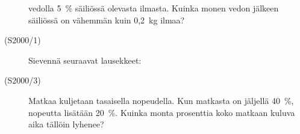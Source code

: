 \begin{description}
                        vedolla 5~\% säiliössä olevasta ilmasta. Kuinka monen vedon
                        jälkeen säiliössä on vähemmän kuin 0,2~kg ilmaa?
    \item[(S2000/1)]   Sievennä seuraavat lausekkeet:
                        \begin{alakohdat}
                        \end{alakohdat}
    \item[(S2000/3)]   Matkaa kuljetaan tasaisella nopeudella. Kun matkasta on
                        jäljellä 40~\%, nopeutta lisätään 20~\%. Kuinka monta
                        prosenttia koko matkaan kuluva aika tällöin lyhenee?

\end{description}

